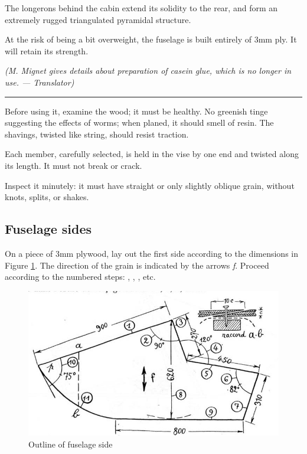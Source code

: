 \documentclass{book}
\newcommand*\circled[1]{\tikz[baseline=(char.base)]{
    \node[shape=circle,draw,inner sep=0.15pt] (char) {\footnotesize#1};}}
\newcommand*\sectline{
  \vspace{5pt}
  \begin{center}
    \rule{0.5\linewidth}{\linethickness}
  \end{center}
  \vspace{5pt}
}
\begin{document}
The longerons behind the cabin extend its solidity to the rear, and
form an extremely rugged triangulated pyramidal structure.

At the risk of being a bit overweight, the fuselage is built entirely
of 3mm ply.  It will retain its strength.

\textit{(M. Mignet gives details about preparation of casein glue,
  which is no longer in use. --- Translator)}

\sectline

Before using it, examine the wood; it must be healthy.  No greenish
tinge suggesting the effects of worms; when planed, it should smell of
resin. The shavings, twisted like string, should resist traction.

Each member, carefully selected, is held in the vise by one end and
twisted along its length.  It must not break or crack.

Inspect it minutely: it must have straight or only slightly oblique
grain, without knots, splits, or shakes.

\subsection{Fuselage sides}

On a piece of 3mm plywood, lay out the first side according to the
dimensions in Figure \ref{fig:sixteen}.  The direction of the grain is
indicated by the arrows \textsl{f}.  Proceed according to the numbered
steps: \circled{1}, \circled{2}, \circled{3}, etc.

\begin{figure}
  \includegraphics[width=\linewidth]{fig-16.jpg}
  \caption{Outline of fuselage side}
  \label{fig:sixteen}
\end{figure}
\end{document}
